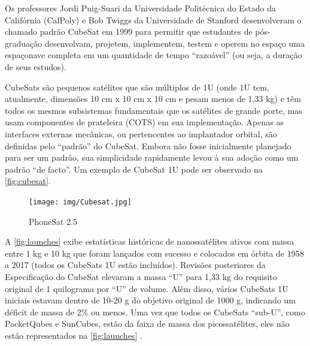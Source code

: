\documentclass[
	12pt,				%
	openright,			%
	twoside,			%
	a4paper,			%
	english,			%
	french,				%
	spanish,			%
	brazil				%
	]{abntex2}
\newcommand{\quotes}[1]{``#1''}
\begin{document}
Os professores Jordi Puig-Suari da Universidade Politécnica do Estado da Califórnia (CalPoly) e Bob Twiggs da Universidade de Stanford desenvolveram o chamado padrão CubeSat em 1999 para permitir que estudantes de pós-graduação desenvolvam, projetem, implementem, testem e operem no espaço uma espaçonave completa em um quantidade de tempo \quotes{razoável} (ou seja, a duração de seus estudos).

CubeSats são pequenos satélites que são múltiplos de 1U (onde 1U tem, atualmente, dimensões 10 cm x 10 cm x 10 cm e pesam menos de 1,33 kg) e têm todos os mesmos subsistemas fundamentais que os satélites de grande porte, mas usam componentes de prateleira (COTS) em sua implementação. Apenas as interfaces externas mecânicas, ou pertencentes ao implantador orbital, são definidas pelo \quotes{padrão} do CubeSat. Embora não fosse inicialmente planejado para ser um padrão, sua simplicidade rapidamente levou à sua adoção como um padrão \quotes{de facto}. Um exemplo de CubeSat 1U pode ser observado na \autoref{fig:cubesat}.

\begin{figure}[H]
	\caption{\label{fig:cubesat}PhoneSat 2.5}
	\begin{center}
	    \texttt{[image: img/Cubesat.jpg]}
	\end{center}
\end{figure}

A \autoref{fig:launches} exibe estatísticas históricas de nanossatélites ativos com massa entre 1 kg e 10 kg que foram lançados com sucesso e colocados em órbita de 1958 a 2017 (todos os CubeSats 1U estão incluídos). Revisões posteriores da Especificação do CubeSat elevaram a massa \quotes{U} para 1,33 kg do requisito original de 1 quilograma por \quotes{U} de volume. Além disso, vários CubeSats 1U iniciais estavam dentro de 10-20 g do objetivo original de 1000 g, indicando um déficit de massa de 2\% ou menos. Uma vez que todos os CubeSats \quotes{sub-U}, como PocketQubes e SunCubes, estão da faixa de massa dos picossatélites, eles não estão representados na \autoref{fig:launches} \cite{carvalho_2020}.
\end{document}
